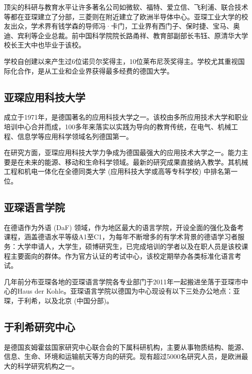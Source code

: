     顶尖的科研与教育水平让许多著名公司如微软、福特、爱立信、飞利浦、联合技术等都在亚琛建立了分部，三菱则在附近建立了欧洲半导体中心。亚琛工业大学的校友出众，学术界有钱学森的导师冯·卡门，工业界有西门子、保时捷、宝马、奥迪、宾利等企业总裁。前中国科学院院长路甬祥、教育部副部长韦钰、原清华大学校长王大中也毕业于该校。

    学校自创建以来产生过6位诺贝尔奖得主，10位莱布尼茨奖得主。学校尤其重视国际化合作，是从工业和企业界获得最多经费的德国大学。

  \subsection{亚琛应用科技大学}\label{subsec:亚琛应用科技大学}

    \href{https://www.fh-aachen.de/}{}成立于1971年，是德国著名的应用科技大学之一。该校由多所应用技术大学和职业培训中心合并而成，100多年来落实以实践为导向的教育传统，在电气、机械工程、信息学等应用科学领域名列德国第一。

    在研究方面，亚琛应用科技大学力争成为德国最强大的应用技术大学之一。能力主要是在未来的能源、移动和生命科学领域。最新的研究成果直接纳入教学。其机械工程和机电一体化在全德同类大学 (应用科技大学或高等专科学校) 中排名第一位。

  \subsection{亚琛语言学院}\label{subsec:亚琛语言学院}

    在德语作为外语 (DaF) 领域，\href{https://www.spraachen.org/}{}作为地区最大的语言学院，开设全面的强化及备考课程，涵盖德语水平等级A1至C1，为每年不断增多的有学术背景的德语学习者服务：大学申请人，大学生，硕博研究生，已完成培训的学者以及在职人员是该校课程主要面向的群体。作为官方认证的考试中心，该校定期举办各类标准化语言考试。

    几年前分布亚琛各地的亚琛语言学院各专业部门于2011年一起搬进坐落于亚琛市中心的Haus der Kohle。亚琛语言学院以德国为中心现设有以下三处办公地点：亚琛，于利希，以及北京 (中国分部)。

  \subsection{于利希研究中心}\label{subsec:于利希研究中心}

    \href{https://www.fz-juelich.de/portal/DE/Home/home_node.html}{}是德国亥姆霍兹国家研究中心联合会的下属科研机构，主要从事物质结构、能源、信息、生命、环境和运输航天等方向的研究。现有超过5000名研究人员，是欧洲最大的科学研究机构之一。

